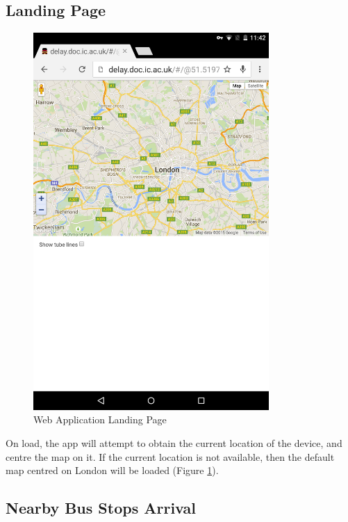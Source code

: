 \subsection{Landing Page}

\begin{figure}
\centering
\includegraphics[width=0.8\textwidth]{figures/landing_page.png}
\caption{\label{fig:landing_page} Web Application Landing Page}
\end{figure}

\par On load, the app will attempt to obtain the current location of the device, and centre the map on it. If the current location is not available, then the default map centred on London will be loaded (Figure \ref{fig:landing_page}).


\subsection{Nearby Bus Stops Arrival}

